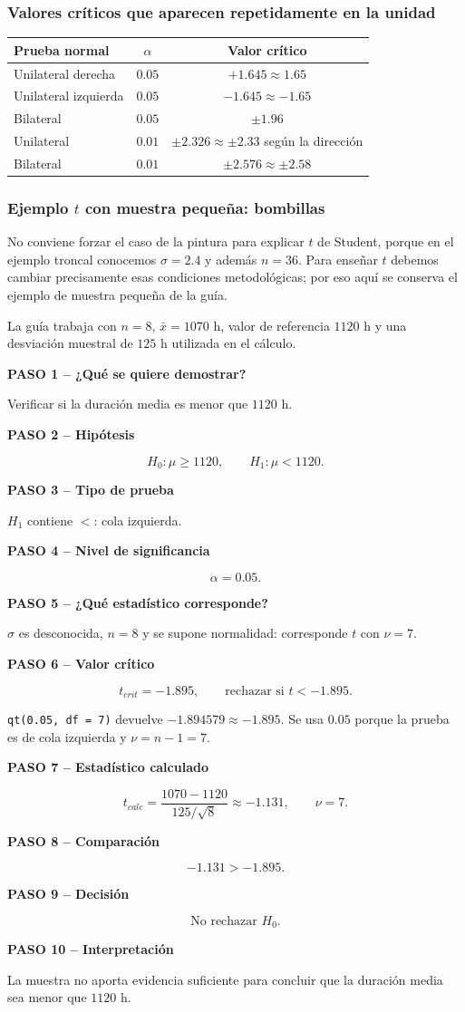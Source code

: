 \documentclass[11pt,a4paper]{article}
\newcommand{\paso}[2]{\par\medskip\noindent\textbf{PASO #1 -- #2}\par}
\begin{document}
\subsubsection{Valores críticos que aparecen repetidamente en la unidad}

\begin{table}[H]
\centering
\begin{tabular}{lcc}
\toprule
Prueba normal & $\alpha$ & Valor crítico \\
\midrule
Unilateral derecha & $0.05$ & $+1.645\approx1.65$\\
Unilateral izquierda & $0.05$ & $-1.645\approx-1.65$\\
Bilateral & $0.05$ & $\pm1.96$\\
Unilateral & $0.01$ & $\pm2.326\approx\pm2.33$ según la dirección\\
Bilateral & $0.01$ & $\pm2.576\approx\pm2.58$\\
\bottomrule
\end{tabular}
\end{table}

\subsubsection{\texorpdfstring{Ejemplo $t$ con muestra pequeña: bombillas}{Ejemplo t con muestra pequeña: bombillas}}

\begin{aclaracion}
No conviene forzar el caso de la pintura para explicar $t$ de Student, porque en el ejemplo troncal conocemos $\sigma=2.4$ y además $n=36$. Para enseñar $t$ debemos cambiar precisamente esas condiciones metodológicas; por eso aquí se conserva el ejemplo de muestra pequeña de la guía.
\end{aclaracion}

La guía trabaja con $n=8$, $\bar{x}=1070$ h, valor de referencia $1120$ h y una desviación muestral de $125$ h utilizada en el cálculo.

\paso{1}{¿Qué se quiere demostrar?} Verificar si la duración media es menor que $1120$ h.
\paso{2}{Hipótesis} \[H_0:\mu\ge1120,\qquad H_1:\mu<1120.\]
\paso{3}{Tipo de prueba} $H_1$ contiene $<$: cola izquierda.
\paso{4}{Nivel de significancia} \[\alpha=0.05.\]
\paso{5}{¿Qué estadístico corresponde?} $\sigma$ es desconocida, $n=8$ y se supone normalidad: corresponde $t$ con $\nu=7$.
\paso{6}{Valor crítico} \[t_{crit}=-1.895,\qquad \text{rechazar si }t<-1.895.\]
\begin{calculor}
\texttt{qt(0.05, df = 7)} devuelve $-1.894579\approx-1.895$. Se usa $0.05$ porque la prueba es de cola izquierda y $\nu=n-1=7$.
\end{calculor}
\paso{7}{Estadístico calculado}
\[
t_{calc}=\frac{1070-1120}{125/\sqrt8}\approx-1.131,
\qquad \nu=7.
\]
\paso{8}{Comparación} \[-1.131>-1.895.\]
\paso{9}{Decisión} \[\boxed{\text{No rechazar }H_0}.\]
\paso{10}{Interpretación} La muestra no aporta evidencia suficiente para concluir que la duración media sea menor que $1120$ h.
\end{document}

